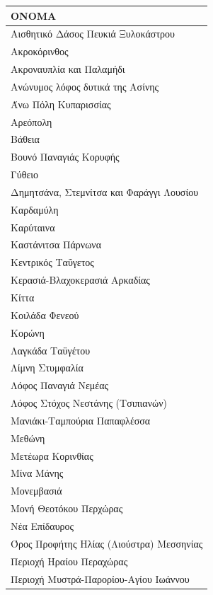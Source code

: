 \documentclass[12pt]{article}
\begin{document}
	\begin{table}[H]
		\centering
		\label{my-label}

		\begin{tabular}{|l|}
			\hline
			\textbf{ΟΝΟΜΑ} \\
			\hline
			Αισθητικό Δάσος Πευκιά Ξυλοκάστρου \\ \hline
			Ακροκόρινθος \\ \hline
			Ακροναυπλία και Παλαμήδι \\ \hline
			Ανώνυμος λόφος δυτικά της Ασίνης \\ \hline
			Άνω Πόλη Κυπαρισσίας \\ \hline
			Αρεόπολη \\ \hline
			Βάθεια \\ \hline
			Βουνό Παναγιάς Κορυφής \\ \hline
			Γύθειο \\ \hline
			Δημητσάνα, Στεμνίτσα και Φαράγγι Λουσίου \\ \hline
			Καρδαμύλη \\ \hline
			Καρύταινα \\ \hline
			Καστάνιτσα Πάρνωνα \\ \hline
			Κεντρικός Ταΰγετος  \\ \hline
			Κερασιά-Βλαχοκερασιά Αρκαδίας \\ \hline
			Κίττα \\ \hline
			Κοιλάδα Φενεού \\ \hline
			Κορώνη \\ \hline
			Λαγκάδα Ταϋγέτου \\ \hline
			Λίμνη Στυμφαλία \\ \hline
			Λόφος Παναγιά Νεμέας \\ \hline
			Λόφος Στόχος Νεστάνης (Τσιπιανών) \\ \hline
			Μανιάκι-Ταμπούρια Παπαφλέσσα \\ \hline
			Μεθώνη \\ \hline
			Μετέωρα Κορινθίας \\ \hline
			Μίνα Μάνης \\ \hline
			Μονεμβασιά \\ \hline
			Μονή Θεοτόκου Περχώρας \\ \hline
			Νέα Επίδαυρος \\ \hline
			Όρος Προφήτης Ηλίας (Λιούστρα) Μεσσηνίας \\ \hline
			Περιοχή Ηραίου Περαχώρας \\ \hline
			Περιοχή Μυστρά-Παρορίου-Αγίου Ιωάννου \\ \hline
		\end{tabular}
	\end{table}
\end{document}
